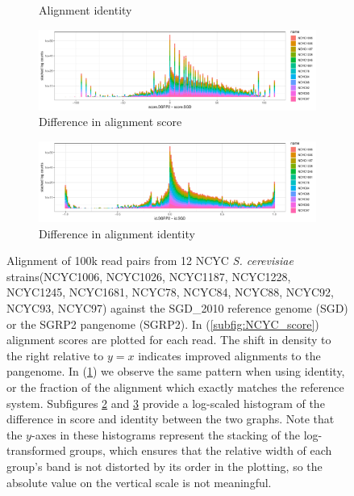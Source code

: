 \begin{figure}[htbp!]
\begin{subfigure}[t]{0.49\textwidth}
    \caption{Alignment identity} \label{subfig:NCYC_identity}
  \end{subfigure}
  \begin{subfigure}[t]{1.0\textwidth}
    \includegraphics[width=1.0\textwidth]{Chapter3/Figs/NCYC_SGRP2_SGD_comparison_score_hist_color.pdf}
    \caption{Difference in alignment score} \label{subfig:NCYC_score_diff_hist}
  \end{subfigure}
  \begin{subfigure}[t]{1.0\textwidth}
    \includegraphics[width=1.0\textwidth]{Chapter3/Figs/NCYC_SGRP2_SGD_comparison_id_hist_color.pdf}
    \caption{Difference in alignment identity} \label{subfig:NCYC_id_diff_hist}
  \end{subfigure}
  \caption[Comparing alignment to the linear reference and SGRP2]{
    Alignment of 100k read pairs from 12 NCYC \emph{S. cerevisiae} strains(NCYC1006, NCYC1026, NCYC1187, NCYC1228, NCYC1245, NCYC1681, NCYC78, NCYC84, NCYC88, NCYC92, NCYC93, NCYC97) against the SGD\_2010 reference genome (SGD) or the SGRP2 pangenome (SGRP2).
    In (\ref{subfig:NCYC_score}) alignment scores are plotted for each read.
    The shift in density to the right relative to $y=x$ indicates improved alignments to the pangenome.
    In (\ref{subfig:NCYC_identity}) we observe the same pattern when using identity, or the fraction of the alignment which exactly matches the reference system.
    Subfigures \ref{subfig:NCYC_score_diff_hist} and \ref{subfig:NCYC_id_diff_hist} provide a log-scaled histogram of the difference in score and identity between the two graphs.
    Note that the $y$-axes in these histograms represent the stacking of the log-transformed groups, which ensures that the relative width of each group's band is not distorted by its order in the plotting, so the absolute value on the vertical scale is not meaningful.
  }
\label{fig:NCYC_SGD_SGRP2}
\end{figure}

